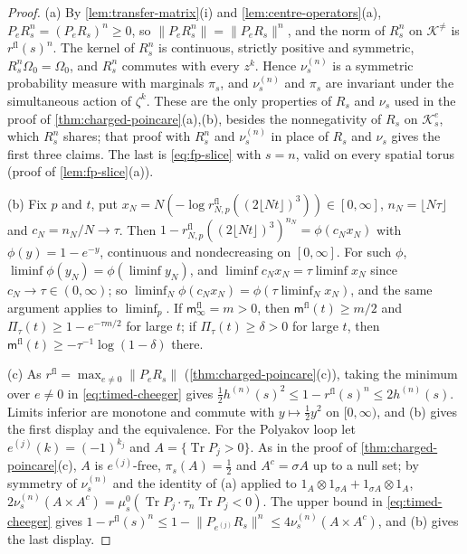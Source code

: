 \documentclass[11pt,a4paper]{amsart}
\theoremstyle{definition}
\theoremstyle{remark}
\numberwithin{equation}{section}
\DeclareMathOperator{\Tr}{Tr}        %
\newcommand{\Kspace}{\mathcal{K}}    %
\newcommand{\norm}[1]{\lVert #1\rVert}     %
\newcommand{\cube}[1]{(2#1)^3}             %
\newcommand{\Omegazero}{\Omega_0}          %
\begin{document}
\begin{proof}
(a) By \cref{lem:transfer-matrix}(i) and \cref{lem:centre-operators}(a), $P_eR_s^n=(P_eR_s)^n\ge0$, so $\norm{P_eR_s^n}=\norm{P_eR_s}^n$, and the norm of $R_s^n$ on $\Kspace^{\ne}$ is $r^{\mathrm{fl}}(s)^n$. The kernel of $R_s^n$ is continuous, strictly positive and symmetric, $R_s^n\Omegazero=\Omegazero$, and $R_s^n$ commutes with every $z^k$. Hence $\nu^{(n)}_s$ is a symmetric probability measure with marginals $\pi_s$, and $\nu^{(n)}_s$ and $\pi_s$ are invariant under the simultaneous action of $\zeta^k$. These are the only properties of $R_s$ and $\nu_s$ used in the proof of \cref{thm:charged-poincare}(a),(b), besides the nonnegativity of $R_s$ on $\Kspace^e_s$, which $R_s^n$ shares; that proof with $R_s^n$ and $\nu^{(n)}_s$ in place of $R_s$ and $\nu_s$ gives the first three claims. The last is \eqref{eq:fp-slice} with $s=n$, valid on every spatial torus (proof of \cref{lem:fp-slice}(a)).

(b) Fix $p$ and $t$, put $x_N=N(-\log r^{\mathrm{fl}}_{N,p}(\cube{\lfloor Nt\rfloor}))\in[0,\infty]$, $n_N=\lfloor N\tau\rfloor$ and $c_N=n_N/N\to\tau$. Then $1-r^{\mathrm{fl}}_{N,p}(\cube{\lfloor Nt\rfloor})^{n_N}=\phi(c_Nx_N)$ with $\phi(y)=1-e^{-y}$, continuous and nondecreasing on $[0,\infty]$. For such $\phi$, $\liminf\phi(y_N)=\phi(\liminf y_N)$, and $\liminf c_Nx_N=\tau\liminf x_N$ since $c_N\to\tau\in(0,\infty)$; so $\liminf_N\phi(c_Nx_N)=\phi(\tau\liminf_Nx_N)$, and the same argument applies to $\liminf_p$. If $\mathsf m^{\mathrm{fl}}_\infty=m>0$, then $\mathsf m^{\mathrm{fl}}(t)\ge m/2$ and $\Pi_\tau(t)\ge1-e^{-\tau m/2}$ for large $t$; if $\Pi_\tau(t)\ge\delta>0$ for large $t$, then $\mathsf m^{\mathrm{fl}}(t)\ge-\tau^{-1}\log(1-\delta)$ there.

(c) As $r^{\mathrm{fl}}=\max_{e\ne0}\norm{P_eR_s}$ (\cref{thm:charged-poincare}(c)), taking the minimum over $e\ne0$ in \eqref{eq:timed-cheeger} gives $\frac12h^{(n)}(s)^2\le1-r^{\mathrm{fl}}(s)^n\le2h^{(n)}(s)$. Limits inferior are monotone and commute with $y\mapsto\frac12y^2$ on $[0,\infty)$, and (b) gives the first display and the equivalence. For the Polyakov loop let $e^{(j)}(k)=(-1)^{k_j}$ and $A=\{\Tr P_j>0\}$. As in the proof of \cref{thm:charged-poincare}(c), $A$ is $e^{(j)}$-free, $\pi_s(A)=\frac12$ and $A^c=\sigma A$ up to a null set; by symmetry of $\nu^{(n)}_s$ and the identity of (a) applied to $1_A\otimes1_{\sigma A}+1_{\sigma A}\otimes1_A$, $2\nu^{(n)}_s(A\times A^c)=\mu^0_s(\Tr P_j\cdot\tau_n\Tr P_j<0)$. The upper bound in \eqref{eq:timed-cheeger} gives $1-r^{\mathrm{fl}}(s)^n\le1-\norm{P_{e^{(j)}}R_s}^n\le4\nu^{(n)}_s(A\times A^c)$, and (b) gives the last display.
\end{proof}
\end{document}
